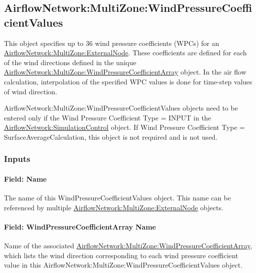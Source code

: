 \subsection{AirflowNetwork:MultiZone:WindPressureCoefficientValues}\label{airflownetworkmultizonewindpressurecoefficientvalues}

This object specifies up to 36 wind pressure coefficients (WPCs) for an \hyperref[airflownetworkmultizoneexternalnode]{AirflowNetwork:MultiZone:ExternalNode}. These coefficients are defined for each of the wind directions defined in the unique \hyperref[airflownetworkmultizonewindpressurecoefficientarray]{AirflowNetwork:MultiZone:WindPressureCoefficientArray} object. In the air flow calculation, interpolation of the specified WPC values is done for time-step values of wind direction.

AirflowNetwork:MultiZone:WindPressureCoefficientValues objects need to be entered only if the Wind Pressure Coefficient Type = INPUT in the \hyperref[airflownetworksimulationcontrol]{AirflowNetwork:\hyperref[simulationcontrol]{SimulationControl}} object. If Wind Pressure Coefficient Type = SurfaceAverageCalculation, this object is not required and is not used.

\subsubsection{Inputs}\label{inputs-10-001}

\paragraph{Field: Name}\label{field-name-10-001}

The name of this WindPressureCoefficientValues object. This name can be referenced by multiple \hyperref[airflownetworkmultizoneexternalnode]{AirflowNetwork:MultiZone:ExternalNode} objects.

\paragraph{Field: WindPressureCoefficientArray Name}\label{field-windpressurecoefficientarray-name}

Name of the associated \hyperref[airflownetworkmultizonewindpressurecoefficientarray]{AirflowNetwork:MultiZone:WindPressureCoefficientArray}, which lists the wind direction corresponding to each wind pressure coefficient value in this AirflowNetwork:MultiZone:WindPressureCoefficientValues object.

